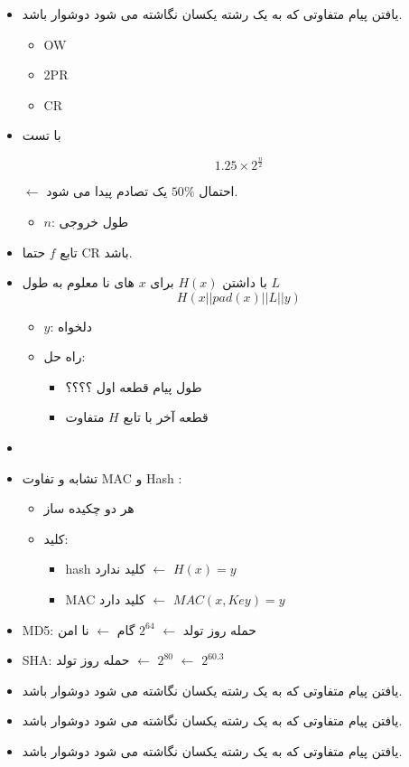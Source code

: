 \documentclass{report}
\begin{document}
\begin{itemize}
		\item 
یافتن پیام متفاوتی که به یک رشته یکسان نگاشته می شود دوشوار باشد.
			\begin{itemize}
				\item OW
				\item 2PR
				\item CR
			\end{itemize}
		\item 
با تست 

{ \large $$1.25\times2^{\frac{n}{2}}$$ }

$\leftarrow$
احتمال $50 \%$ یک تصادم پیدا می شود.
			\begin{itemize}
				\item $n$: 
				طول خروجی
			\end{itemize}
		\item 
			تابع $f$ حتما CR باشد.
		\item 
با داشتن $H(x)$ برای $x$ های نا معلوم به طول $L$
{\large $$H(x || pad(x) || L || y)$$}
			\begin{itemize}
				\item $y$:
				دلخواه
			\end{itemize}
			
			\begin{itemize}
				\item راه حل:
					\begin{itemize}
						\item
						 طول پیام قطعه اول ؟؟؟؟
						\item
						قطعه آخر با تابع $H$ متفاوت
					\end{itemize}
			\end{itemize}
	\item 

	\item 
تشابه و تفاوت MAC و Hash :
		\begin{itemize}
			\item 
			هر دو چکیده ساز 
			\item 
			کلید:
				\begin{itemize}
					\item hash
					کلید ندارد 
					$\leftarrow$
					$H(x) = y$
					\item MAC
					کلید دارد
					$\leftarrow$
					$MAC(x,Key)=y$
				\end{itemize}
		\end{itemize}
	\item 
				MD5:
				حمله روز تولد 
				$\leftarrow$
				$2^{64}$
				گام 
				$\leftarrow$
				نا امن
	\item 
				SHA:
				حمله روز تولد 
				$\leftarrow$
				$2^{80}$
				$\leftarrow$
				$2^{60.3}$
	\item 
یافتن پیام متفاوتی که به یک رشته یکسان نگاشته می شود دوشوار باشد.
	\item 
یافتن پیام متفاوتی که به یک رشته یکسان نگاشته می شود دوشوار باشد.
	\item 
یافتن پیام متفاوتی که به یک رشته یکسان نگاشته می شود دوشوار باشد.
	\end{itemize}
\end{document}
